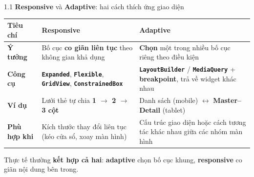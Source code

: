 \documentclass[aspectratio=169,10pt]{beamer}
\newcommand{\api}[1]{\texttt{\bfseries #1}}   %
\begin{document}
\begin{frame}{1.1 \textbf{Responsive} và \textbf{Adaptive}: hai cách thích ứng giao diện}
  \footnotesize
  \renewcommand{\arraystretch}{1.45}
  \centering
  \begin{tabular}{@{}>{\raggedright\arraybackslash}p{2.2cm}>{\raggedright\arraybackslash}p{5.2cm}>{\raggedright\arraybackslash}p{5.2cm}@{}}
    \hline
    \rowcolor{cHead}\textbf{Tiêu chí} & \textbf{Responsive} & \textbf{Adaptive}\\ \hline
    \textbf{Ý tưởng} & Bố cục \textbf{co giãn liên tục} theo không gian khả dụng & \textbf{Chọn} một trong nhiều bố cục riêng theo điều kiện\\ \hline
    \textbf{Công cụ} & \api{Expanded}, \api{Flexible}, \api{GridView}, \api{ConstrainedBox} & \api{LayoutBuilder} / \api{MediaQuery} + \textbf{breakpoint}, trả về widget khác nhau\\ \hline
    \textbf{Ví dụ} & Lưới thẻ tự chia \textbf{1 $\rightarrow$ 2 $\rightarrow$ 3 cột} & Danh sách (mobile) $\leftrightarrow$ \textbf{Master--Detail} (tablet)\\ \hline
    \textbf{Phù hợp khi} & Kích thước thay đổi liên tục (kéo cửa sổ, xoay màn hình) & Cấu trúc giao diện hoặc cách tương tác khác nhau giữa các nhóm màn hình\\ \hline
  \end{tabular}

  \vspace{8pt}
  \small Thực tế thường \textbf{kết hợp cả hai}: \textbf{adaptive} chọn bố cục khung, \textbf{responsive} co giãn nội dung bên trong.
\end{frame}
\end{document}
